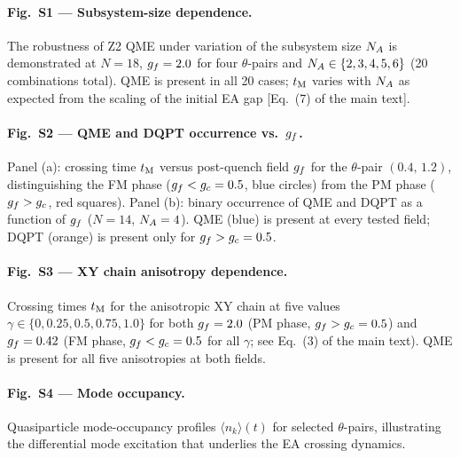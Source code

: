 
\paragraph{Fig.~S1 — Subsystem-size dependence.}
The robustness of Z2 QME under variation of the subsystem size $N_A$ is demonstrated
at $N=18$, $g_f=2.0$ for four $\theta$-pairs and $N_A \in \{2,3,4,5,6\}$
(20 combinations total). QME is present in all 20 cases; $t_{\rm M}$ varies with $N_A$
as expected from the scaling of the initial EA gap [Eq.~(7) of the main text].

\paragraph{Fig.~S2 — QME and DQPT occurrence vs.\ $g_f$.}
Panel (a): crossing time $t_{\rm M}$ versus post-quench field $g_f$ for the
$\theta$-pair $(0.4,\,1.2)$, distinguishing the FM phase ($g_f < g_c = 0.5$,
blue circles) from the PM phase ($g_f > g_c$, red squares).
Panel (b): binary occurrence of QME and DQPT as a function of $g_f$
($N=14$, $N_A=4$). QME (blue) is present at every tested field; DQPT (orange)
is present only for $g_f > g_c = 0.5$.

\paragraph{Fig.~S3 — XY chain anisotropy dependence.}
Crossing times $t_{\rm M}$ for the anisotropic XY chain at five values
$\gamma \in \{0, 0.25, 0.5, 0.75, 1.0\}$ for both $g_f=2.0$ (PM phase,
$g_f > g_c = 0.5$) and $g_f=0.42$ (FM phase, $g_f < g_c = 0.5$ for all
$\gamma$; see Eq.~(3) of the main text). QME is present for all five
anisotropies at both fields.

\paragraph{Fig.~S4 — Mode occupancy.}
Quasiparticle mode-occupancy profiles $\langle n_k\rangle(t)$ for selected
$\theta$-pairs, illustrating the differential mode excitation that underlies
the EA crossing dynamics.

